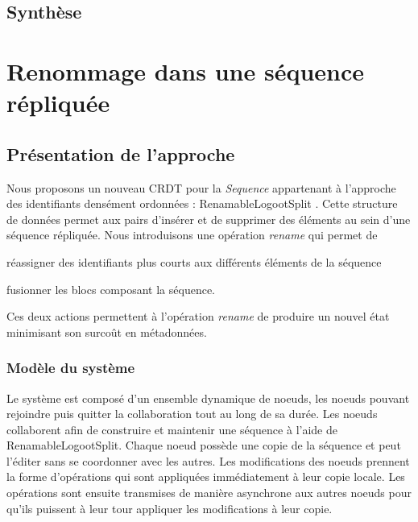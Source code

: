 \documentclass[12pt]{thesul}
\begin{document}
\section{Synthèse}

% 

\NumberThisInToc
\chapter{Renommage dans une séquence répliquée}
\minitoc

\label{chap:renamablelogootsplit}

\section{Présentation de l'approche}

Nous proposons un nouveau \ac{CRDT} pour la \emph{Sequence} appartenant à l'approche des identifiants densément ordonnées : RenamableLogootSplit \cite{nicolas:hal-01932552,nicolas:hal-02526724}.
Cette structure de données permet aux pairs d'insérer et de supprimer des éléments au sein d'une séquence répliquée.
Nous introduisons une opération \emph{rename} qui permet de
\begin{enumerate*}[label=(\roman*)]
  \item réassigner des identifiants plus courts aux différents éléments de la séquence
  \item fusionner les blocs composant la séquence.
\end{enumerate*}
Ces deux actions permettent à l'opération \emph{rename} de produire un nouvel état minimisant son surcoût en métadonnées.

\subsection{Modèle du système}

Le système est composé d'un ensemble dynamique de noeuds, les noeuds pouvant rejoindre puis quitter la collaboration tout au long de sa durée.
Les noeuds collaborent afin de construire et maintenir une séquence à l'aide de RenamableLogootSplit.
Chaque noeud possède une copie de la séquence et peut l'éditer sans se coordonner avec les autres.
Les modifications des noeuds prennent la forme d'opérations qui sont appliquées immédiatement à leur copie locale.
Les opérations sont ensuite transmises de manière asynchrone aux autres noeuds pour qu'ils puissent à leur tour appliquer les modifications à leur copie.
\end{document}
